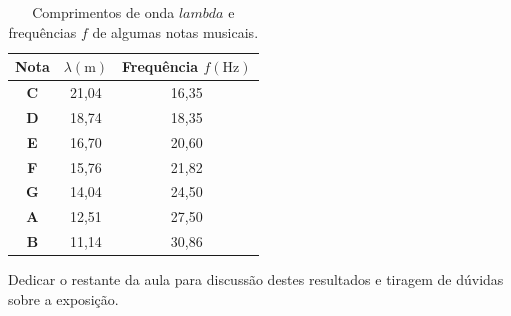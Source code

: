     \begin{table}[!ht]
        \centering
        \begin{tabular}{|c|c|c|}
        \hline
        \textbf{Nota} & \textbf{$\lambda(\textrm{m})$} & \textbf{Frequência $f(\textrm{Hz})$} \\ \hline
        \textbf{C}    & 21,04                          & 16,35                                \\ \hline
        \textbf{D}    & 18,74                          & 18,35                                \\ \hline
        \textbf{E}    & 16,70                          & 20,60                                \\ \hline
        \textbf{F}    & 15,76                          & 21,82                                \\ \hline
        \textbf{G}    & 14,04                          & 24,50                                \\ \hline
        \textbf{A}    & 12,51                          & 27,50                                \\ \hline
        \textbf{B}    & 11,14                          & 30,86                                \\ \hline
        \end{tabular}
        \caption{Comprimentos de onda $lambda$ e frequências $f$ de algumas notas musicais.}
        \label{tab:notas-musicais}
    \end{table}
    \vspace*{10pt}
    
    Dedicar o restante da aula para discussão destes resultados e tiragem de dúvidas sobre a exposição.

    